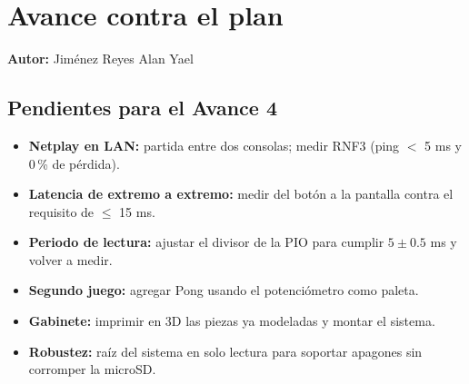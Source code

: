 \section{Avance contra el plan}
\textbf{Autor:} Jiménez Reyes Alan Yael

\subsection{Pendientes para el Avance 4}
\begin{itemize}
	\item \textbf{Netplay en LAN:} partida entre dos consolas; medir RNF3 (ping $<$ 5 ms y 0\,\% de pérdida).
	\item \textbf{Latencia de extremo a extremo:} medir del botón a la pantalla contra el requisito de $\leq$ 15 ms.
	\item \textbf{Periodo de lectura:} ajustar el divisor de la PIO para cumplir $5 \pm 0.5$ ms y volver a medir.
	\item \textbf{Segundo juego:} agregar Pong usando el potenciómetro como paleta.
	\item \textbf{Gabinete:} imprimir en 3D las piezas ya modeladas y montar el sistema.
	\item \textbf{Robustez:} raíz del sistema en solo lectura para soportar apagones sin corromper la microSD.
\end{itemize}

